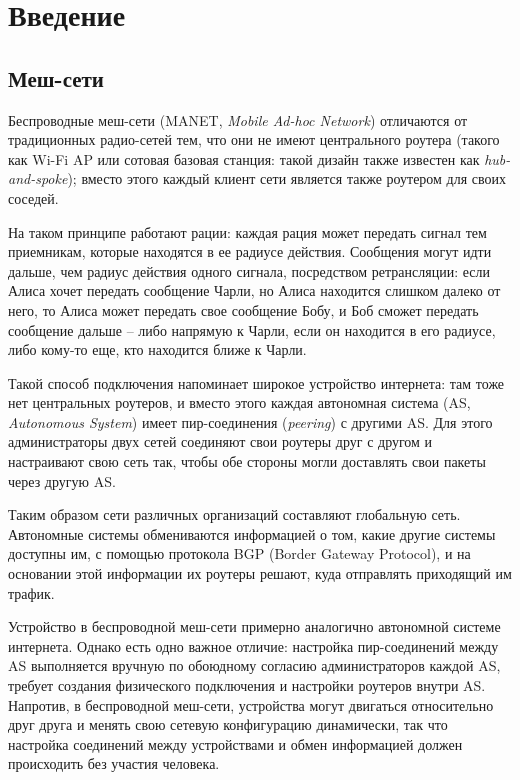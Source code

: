 \documentclass[%
]{article}
\begin{document}
\section{Введение}
\label{sec:intro}

\subsection{Меш-сети}
Беспроводные меш-сети (MANET, \emph{Mobile Ad-hoc Network})
отличаются от традиционных радио-сетей тем,
что они не имеют центрального роутера (такого как Wi-Fi AP или сотовая базовая станция: такой дизайн также известен как \emph{hub-and-spoke});
вместо этого каждый клиент сети является также роутером для своих соседей.

На таком принципе работают рации:
каждая рация может передать сигнал тем приемникам, которые находятся в ее радиусе действия.
Сообщения могут идти дальше, чем радиус действия одного сигнала,
посредством ретрансляции:
если Алиса хочет передать сообщение Чарли,
но Алиса находится слишком далеко от него,
то Алиса может передать свое сообщение Бобу,
и Боб сможет передать сообщение дальше --
либо напрямую к Чарли, если он находится в его радиусе,
либо кому-то еще, кто находится ближе к Чарли.

Такой способ подключения напоминает широкое устройство интернета:
там тоже нет центральных роутеров,
и вместо этого каждая автономная система (AS, \emph{Autonomous System})
имеет пир-соединения (\emph{peering}) с другими AS.
Для этого администраторы двух сетей
соединяют свои роутеры друг с другом
и настраивают свою сеть так, чтобы обе стороны
могли доставлять свои пакеты через другую AS.

Таким образом сети различных организаций составляют глобальную сеть.
Автономные системы обмениваются информацией о том, какие другие системы доступны им,
с помощью протокола BGP (Border Gateway Protocol),
и на основании этой информации их роутеры решают, куда отправлять приходящий им трафик.

Устройство в беспроводной меш-сети примерно аналогично автономной системе интернета.
Однако есть одно важное отличие:
настройка пир-соединений между AS выполняется вручную
по обоюдному согласию администраторов каждой AS,
требует создания физического подключения
и настройки роутеров внутри AS.
Напротив, в беспроводной меш-сети,
устройства могут двигаться относительно друг друга и менять свою сетевую конфигурацию динамически,
так что настройка соединений между устройствами и обмен информацией
должен происходить без участия человека.
\end{document}
